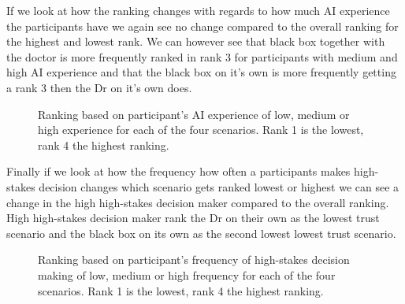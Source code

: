 \documentclass[manuscript,screen,review]{acmart}
\begin{document}
If we look at how the ranking changes with regards to how much AI experience the participants have we again see no change compared to the overall ranking for the highest and lowest rank. We can however see that black box together with the doctor is more frequently ranked in rank 3 for participants with medium and high AI experience and that the black box on it's own is more frequently getting a rank 3 then the Dr on it's own does.

\begin{figure}[h]
    \caption{Ranking based on participant's AI experience of low, medium or high experience for each of the four scenarios. Rank 1 is the lowest, rank 4 the highest ranking.}
    \label{fig:overall-ranking}
\end{figure}

Finally if we look at how the frequency how often a participants makes high-stakes decision changes which scenario gets ranked lowest or highest we can see a change in the high high-stakes decision maker compared to the overall ranking. High high-stakes decision maker rank the Dr on their own as the lowest trust scenario and the black box on its own as the second lowest lowest trust scenario.

\begin{figure}[h]
    \caption{Ranking based on participant's frequency of high-stakes decision making of low, medium or high frequency for each of the four scenarios. Rank 1 is the lowest, rank 4 the highest ranking.}
    \label{fig:overall-ranking}
\end{figure}
\end{document}

